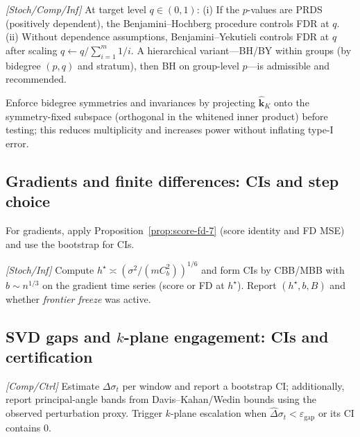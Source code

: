\begin{lemma}[BH/BY control]\label{lem:fdr}
\emph{[\textup{Stoch/Comp/Inf}]}
At target level $q\in(0,1)$:
(i) If the $p$-values are PRDS (positively dependent), the Benjamini--Hochberg procedure controls FDR at $q$.
(ii) Without dependence assumptions, Benjamini--Yekutieli controls FDR at $q$ after scaling $q\leftarrow q/\!\sum_{i=1}^m 1/i$.
A hierarchical variant---BH/BY within groups (by bidegree $(p,q)$ and stratum), then BH on group-level $p$---is admissible and recommended.
\end{lemma}

\begin{remark}\label{rem:symm-proj}
Enforce bidegree symmetries and invariances by projecting $\widehat{\mathbf k}_K$ onto the symmetry-fixed subspace (orthogonal in the whitened inner product) before testing; this reduces multiplicity and increases power without inflating type-I error.
\end{remark}

\subsection{Gradients and finite differences: CIs and step choice}\label{subsec:grad-ci}

For gradients, apply Proposition~\ref{prop:score-fd-7} (score identity and FD MSE) and use the bootstrap for CIs.

\begin{lemma}\label{lem:grad-ci}
\emph{[\textup{Stoch/Inf}]}
Compute $h^\star\asymp(\sigma^2/(mC_b^2))^{1/6}$ and form CIs by CBB/MBB with $b\sim n^{1/3}$ on the gradient time series (score or FD at $h^\star$).
Report $(h^\star, b, B)$ and whether \emph{frontier freeze} was active.
\end{lemma}

\subsection{SVD gaps and $k$-plane engagement: CIs and certification}\label{subsec:gap-ci}

\begin{lemma}\label{lem:gap-ci}
\emph{[\textup{Comp/Ctrl}]}
Estimate $\Delta\sigma_t$ per window and report a bootstrap CI; additionally, report principal-angle bands from Davis--Kahan/Wedin bounds using the observed perturbation proxy. Trigger $k$-plane escalation when $\widehat\Delta\sigma_t<\varepsilon_{\mathrm{gap}}$ or its CI contains $0$.
\end{lemma}

